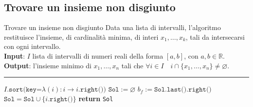 \documentclass[a4paper, 12pt]{report}
\begin{document}
    \subsection{Trovare un insieme non disgiunto}

    \begin{framedalgo}{Trovare un insieme non disgiunto}
        Data una lista di intervalli, l'algoritmo restituisce l'insieme, di cardinalità minima, di interi $x_1, \ldots, x_k$, tali da intersecarsi con ogni intervallo.\\
        \textbf{Input}: $I$ lista di intervalli di numeri reali della forma $[a, b]$, con $a, b \in \mathbb{R}$.\\
        \textbf{Output}: l'insieme minimo di $x_1, \ldots, x_n$ tali che $\forall i \in I \quad i \cap \{x_1, \ldots, x_n\} \neq \varnothing$.

        \hrule
        \begin{algorithmic}[1]
                \State $I\texttt{.sort(key=}\lambda (i) : i \rightarrow i\texttt{.right())}$ 
                \State $\texttt{Sol}:= \varnothing$
                    \State $b_f := \texttt{Sol.last().right()}$ 
                     
                        \State $\texttt{Sol} = \texttt{Sol} \cup \{i\texttt{.right()}\}$
                    \EndIf
                \EndFor
                \State \textbf{return} \texttt{Sol}
            \EndFunction
        \end{algorithmic}
    \end{framedalgo}
\end{document}
